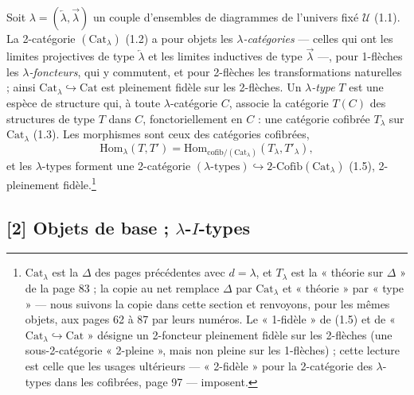 \documentclass[11pt,a4paper]{article}
\begin{document}
Soit $\lambda = (\overleftarrow{\lambda}, \overrightarrow{\lambda})$ un
couple d'ensembles de diagrammes de l'univers fixé $\mathcal{U}$ (1.1). La
2-catégorie $(\mathrm{Cat}_{\lambda})$ (1.2) a pour objets les
\emph{$\lambda$-catégories} — celles qui ont les limites projectives de
type $\overleftarrow{\lambda}$ et les limites inductives de type
$\overrightarrow{\lambda}$ —, pour 1-flèches les \emph{$\lambda$-foncteurs},
qui y commutent, et pour 2-flèches les transformations naturelles ; ainsi
$\mathrm{Cat}_{\lambda} \hookrightarrow \mathrm{Cat}$ est pleinement fidèle
sur les 2-flèches. Un \emph{$\lambda$-type} $T$ est une espèce de structure
qui, à toute $\lambda$-catégorie $C$, associe la catégorie $T(C)$ des
structures de type $T$ dans $C$, fonctoriellement en $C$ : une catégorie
cofibrée $T_{\lambda}$ sur $\mathrm{Cat}_{\lambda}$ (1.3). Les morphismes
sont ceux des catégories cofibrées,
\begin{equation}
\mathrm{Hom}_{\lambda}(T, T') = \mathrm{Hom}_{\mathrm{cofib}/(\mathrm{Cat}_{
\lambda})}(T_{\lambda}, T'_{\lambda}), \tag{1.4}
\end{equation}
et les $\lambda$-types forment une 2-catégorie $(\lambda\text{-types})
\hookrightarrow \text{2-Cofib}(\mathrm{Cat}_{\lambda})$ (1.5), 2-pleinement
fidèle.\footnote{$\mathrm{Cat}_{\lambda}$ est la $\Delta$ des pages
précédentes avec $d = \lambda$, et $T_{\lambda}$ est la « théorie sur
$\Delta$ » de la page 83 ; la copie au net remplace $\Delta$ par
$\mathrm{Cat}_{\lambda}$ et « théorie » par « type » — nous suivons la
copie dans cette section et renvoyons, pour les mêmes objets, aux pages 62
à 87 par leurs numéros. Le « 1-fidèle » de (1.5) et de « $\mathrm{Cat}_{
\lambda} \hookrightarrow \mathrm{Cat}$ » désigne un 2-foncteur pleinement
fidèle sur les 2-flèches (une sous-2-catégorie « 2-pleine », mais non
pleine sur les 1-flèches) ; cette lecture est celle que les usages
ultérieurs — « 2-fidèle » pour la 2-catégorie des $\lambda$-types dans
les cofibrées, page 97 — imposent.}

\subsection*{[2] Objets de base ; $\lambda$-$I$-types}
\end{document}
